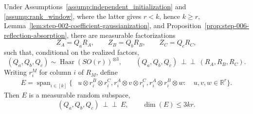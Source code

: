 \begin{proposition}
\label{prop:step-006-product-shape}
\leavevmode\par\noindent
Under Assumptions~\ref{assump:independent_initialization} and
\ref{assump:rank_window}, where the latter gives \(r<k\), hence \(k\ge r\),
Lemma~\ref{lem:step-002-coefficient-gaussianization}, and
Proposition~\ref{prop:step-006-reflection-absorption}, there are measurable
factorizations
\[
  Z_A=Q_aR_A,\qquad Z_B=Q_bR_B,\qquad Z_C=Q_cR_C,              \tag{16}
\]
such that, conditional on the realized factors,
\[
  (Q_a,Q_b,Q_c)\sim
  \operatorname{Haar}(SO(r))^{\otimes3},
  \qquad
  (Q_a,Q_b,Q_c)\ \perp\!\!\!\perp\ (R_A,R_B,R_C).           \tag{17}
\]
Writing \(r_i^M\) for column \(i\) of \(R_M\), define
\[
\begin{aligned}
  E=\operatorname{span}_{i\in[k]}\{&
    u\otimes r_i^B\otimes r_i^C,
    r_i^A\otimes v\otimes r_i^C,
    r_i^A\otimes r_i^B\otimes w:\
   &u,v,w\in\mathbb R^r\}.
\end{aligned}\tag{18}
\]
Then \(E\) is a measurable random subspace,
\[
  (Q_a,Q_b,Q_c)\ \perp\!\!\!\perp\ E,
  \qquad \boxed{\dim(E)\le3kr}.                              \tag{19}
\]

\end{proposition}

